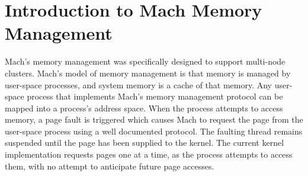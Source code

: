 \documentclass{article}
\begin{document}
\section{Introduction to Mach Memory Management}

Mach's memory management was specifically designed to support
multi-node clusters.  Mach's model of memory management is that memory
is managed by user-space processes, and system memory is a cache of
that memory.  Any user-space process that implements Mach's memory
management protocol can be mapped into a process's address space.
When the process attempts to access memory, a page fault is triggered
which causes Mach to request the page from the user-space process
using a well documented protocol.  The faulting thread remains
suspended until the page has been supplied to the kernel.
The current kernel implementation requests pages one at
a time, as the process attempts to access them, with no attempt
to anticipate future page accesses.
\end{document}
